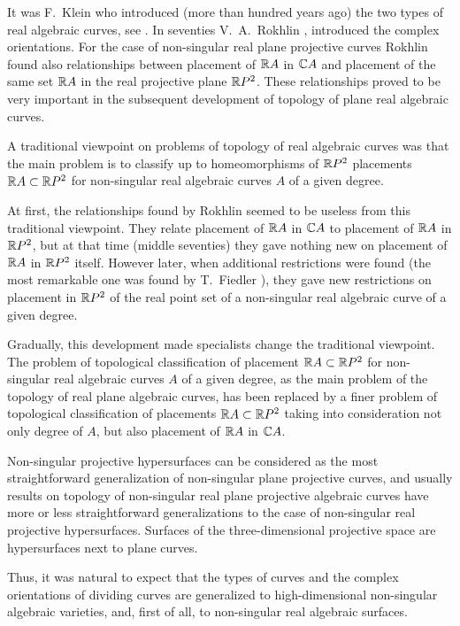 \documentclass{article}
\numberwithin{equation}{section}
\begin{document}
It was F.~Klein who introduced (more than hundred years ago) the
two types of real algebraic curves, see \cite{K}. In seventies V.~A.~Rokhlin
\cite{R2}, \cite{R3} introduced the complex orientations.
For the case of non-singular real plane projective curves Rokhlin found also
relationships between placement of $\mathbb R A$ in $\mathbb C A$ and placement of the same
set $\mathbb R A$ in the real projective plane $\mathbb R P^2$. These relationships proved
to be very important in the subsequent development of topology of plane
real algebraic curves.

A traditional viewpoint on problems of topology of real algebraic curves
was that the main problem is to classify up to homeomorphisms of $\mathbb R P^2$
placements $\mathbb R A\subset\mathbb R P^2$ for non-singular real algebraic curves $A$
of a given degree. 

At first, the relationships found by Rokhlin seemed
to be useless from this traditional viewpoint. They relate placement of
$\mathbb R A$ in $\mathbb C A$ to placement of $\mathbb R A$ in $\mathbb R P^2$, but at that time (middle
seventies) they gave nothing new on placement of $\mathbb R A$ in $\mathbb R P^2$ itself.
However later, when additional restrictions were found (the most
remarkable one was found by T.~Fiedler \cite{F}), they gave new
restrictions on placement in $\mathbb R P^2$ of the real point set of a
non-singular real algebraic curve of a given degree.

Gradually, this development made specialists change the traditional
viewpoint.  The problem of topological classification of placement
$\mathbb R A\subset\mathbb R P^2$ for non-singular real algebraic curves $A$ of a given
degree, as the main problem of the topology of real plane algebraic
curves, has been replaced by a finer problem of topological
classification of placements $\mathbb R A\subset\mathbb R P^2$ taking into consideration
not only degree of $A$, but also placement of $\mathbb R A$ in $\mathbb C A$.

 Non-singular projective hypersurfaces can be considered as the most
straightforward generalization of non-singular plane projective curves,
and usually results on topology of non-singular real plane projective
algebraic curves have more or less straightforward generalizations to
the case of non-singular real projective hypersurfaces. Surfaces of
the three-dimensional projective space are hypersurfaces next to plane
curves.

Thus, it was natural to expect that the types of curves and the complex
orientations of dividing curves are generalized to high-dimensional
non-singular algebraic varieties, and, first of all, to non-singular
real algebraic surfaces.
\end{document}
